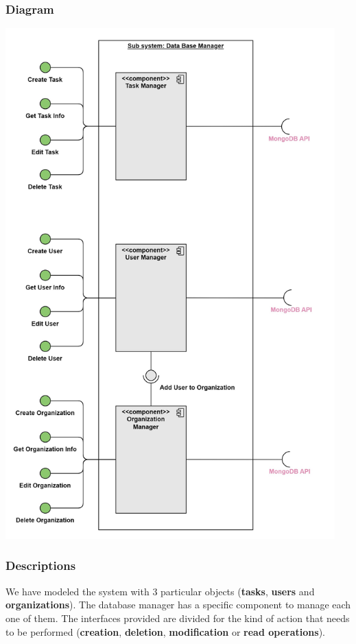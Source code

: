 \documentclass{article}
\begin{document}
\subsubsection{Diagram}
\begin{center}
\includegraphics[width=5in,height=\textheight,keepaspectratio]{images/component_diagram/data_base_manager.jpg}
\end{center}
\subsubsection{Descriptions}

We have modeled the system with 3 particular objects (\textbf{tasks}, \textbf{users} and \textbf{organizations}).
The database manager has a specific component to manage each one of them. The interfaces provided
are divided for the kind of action that needs to be performed (\textbf{creation}, \textbf{deletion}, \textbf{modification} or \textbf{read operations}).
\end{document}
